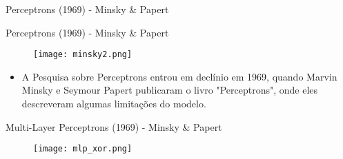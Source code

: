 \begin{frame}{Perceptrons (1969) - Minsky \& Papert}

  \begin{figure}
  \centering
  \end{figure}

\end{frame}

\begin{frame}{Perceptrons (1969) - Minsky \& Papert}

  \begin{figure}
    \texttt{[image: minsky2.png]}
  \end{figure}

  \begin{itemize}
    \item A Pesquisa sobre Perceptrons entrou em declínio em 1969, quando Marvin Minsky e Seymour Papert publicaram o livro "Perceptrons", onde eles descreveram algumas limitações do modelo.
  \end{itemize}

\end{frame}

\begin{frame}{Multi-Layer Perceptrons (1969) - Minsky \& Papert}
  \begin{figure}[t]
    \texttt{[image: mlp\_xor.png]}
    \centering
  \end{figure}
\end{frame}
